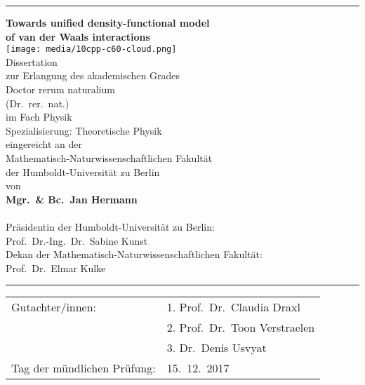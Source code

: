 







\begin{titlepage}
\sffamily
\hrule
\begin{center}
\vfill{\Large\bfseries Towards unified density-functional model\\of van der Waals interactions}\\
\vfill\texttt{[image: media/10cpp-c60-cloud.png]}\\
\vfill{\large Dissertation}\\[1em]
zur Erlangung des akademischen Grades \\[0.5em]
Doctor rerum naturalium \\
(Dr.\ rer.\ nat.) \\[0.5em]
im Fach Physik \\
{\small Spezialisierung: Theoretische Physik} \\[1em]
eingereicht an der \\
Mathematisch-Naturwissenschaftlichen Fakultät \\
der Humboldt-Universität zu Berlin \\[1em]
von \\[0.5em]
{\bfseries Mgr.\ \& Bc.\ Jan Hermann} \\[0.5em]
\ \\[2em]
{\small Präsidentin der Humboldt-Universität zu Berlin: \\
Prof.\ Dr.-Ing.\ Dr.\ Sabine Kunst \\[0.5em]
Dekan der Mathematisch-Naturwissenschaftlichen Fakultät: \\
Prof.\ Dr.\ Elmar Kulke}
\end{center}
\vfill
\hrule
\vspace{1cm}
\begin{tabular}{p{6cm}l}
Gutachter/innen: & 1. Prof.\ Dr.\ Claudia Draxl \\
& 2. Prof.\ Dr.\ Toon Verstraelen \\
& 3. Dr.\ Denis Usvyat \\[1em]
Tag der mündlichen Prüfung: & 15.\ 12.\ 2017
\end{tabular}
\end{titlepage}
\thispagestyle{empty}

\restoregeometry%

